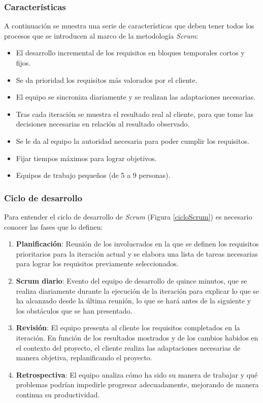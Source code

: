 \subsubsection{Características}
A continuación se muestra una serie de características que deben tener todos los procesos que se introducen al marco 
de la metodología \textit{Scrum}:
\begin{itemize}
    \item El desarrollo incremental de los requisitos en bloques temporales cortos y fijos.
    \item Se da prioridad los requisitos más valorados por el cliente.
    \item El equipo se sincroniza diariamente y se realizan las adaptaciones necesarias.
    \item Tras cada iteración se muestra el resultado real al cliente, para que tome las decisiones 
    necesarias en relación al resultado observado.
    \item Se le da al equipo la autoridad necesaria para poder cumplir los requisitos.
    \item Fijar tiempos máximos para lograr objetivos.
    \item Equipos de trabajo pequeños (de 5 a 9 personas).
\end{itemize}

\subsubsection{Ciclo de desarrollo}
Para entender el ciclo de desarrollo de \textit{Scrum} (Figura \ref*{cicloScrum}) es necesario conocer las fases que lo definen:
\begin{enumerate}
    
    \item \textbf{Planificación}: Reunión de los involucrados en la que se definen los requisitos prioritarios para 
    la iteración actual y se elabora una lista de tareas necesarias para lograr los requisitos previamente seleccionados.

    \item \textbf{Scrum diario}: Evento del equipo de desarrollo de quince minutos, que se realiza diariamente durante la
    ejecución de la iteración para explicar lo que se ha alcanzado desde la última reunión, lo que se hará antes de la 
    siguiente y los obstáculos que se han presentado. 

    \item \textbf{Revisión}: El equipo presenta al cliente los requisitos completados en la iteración. En función de los 
    resultados mostrados y de los cambios habidos en el contexto del proyecto, el cliente realiza las adaptaciones 
    necesarias de manera objetiva, replanificando el proyecto.

    \item \textbf{Retrospectiva}: El equipo analiza cómo ha sido su manera de trabajar y qué problemas podrían impedirle 
    progresar adecuadamente, mejorando de manera continua su productividad.
\end{enumerate}

